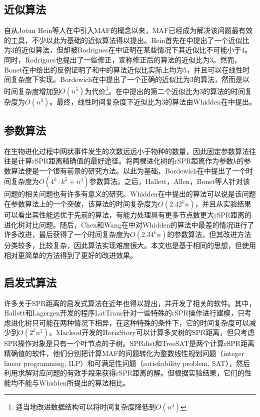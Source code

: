 \subsection{近似算法}
自从Jotun Hein等人在\cite{hein1996complexity}中引入MAF的概念以来，MAF已经成为解决该问题最有效的工具，不少以此为基础的近似算法得以提出。Hein首先在\cite{hein1996complexity}中提出了一个近似比为3的近似算法，但却被Rodrigues在\cite{rodrigues2007maximum}中证明在某些情况下其近似比不可能小于4。同时，Rodrigues也提出了一些修正，宣称修正后的算法的近似比为3。然而，Bonet在\cite{bonet2006approximating}中给出的反例证明了\cite{hein1996complexity}和\cite{rodrigues2007maximum}中的算法近似比实际上均为5，并且可以在线性时间复杂度下实现。Bordewich在\cite{bordewich20083}中提出了一个正确的近似比为3的算法，然而是以时间复杂度增加到$O(n^5)$为代价\footnote{适当地改进数据结构可以将时间复杂度降低到$O(n^4)$}。在\cite{rodrigues2007maximum}中提出的第二个近似比为3的算法的时间复杂度为$O(n^2)$。最终，线性时间复杂度下近似比为3的算法由Whidden在\cite{whidden2009unifying}中提出。                                                                                                                                                                                                                                                             
\subsection{参数算法}
在生物进化过程中网状事件发生的次数远远小于物种的数量，因此固定参数算法往往是计算rSPR距离精确值的最好途径。将两棵进化树的rSPR距离作为参数$k$的参数算法便是一个很有前景的研究方法。以此为基础，Bordewich在\cite{bordewich20083}中提出了一个时间复杂度为$O(4^k \cdot k^5 + n^3)$参数算法。之后，Hallett，Allen，Bonet等人针对该问题的相关问题也有许多有意义的研究。Whidden在\cite{whidden2010fast}中提出的算法可以说是该问题在参数算法上的一个突破，该算法的时间复杂度为$O(2.42^kn)$，并且从实验结果可以看出其性能远优于先前的算法，有能力处理具有更多节点数更大rSPR距离的进化树对比问题。随后，Chen和Wang在\cite{chen2012faster}中对Whidden的算法中最差的情况进行了许多改进，最后获得了一个时间复杂度为$O(2.34^kn)$的参数算法，但其改进方法分类较多，比较复杂，因此算法实现难度很大。本文也是基于相同的思想，但使用相对更简单的方法得到了更好的改进效果。

\subsection{启发式算法}
许多关于SPR距离的启发式算法在近年也得以提出，并开发了相关的软件。其中，Hallett和Lagergen开发的程序LatTrans针对一些特殊的rSPR操作进行建模，只考虑进化树只可能在两种情况下相异，在这种特殊的条件下，它的时间复杂度可以减少到$O(2^kn^2)$。Macleod开发的HorizStory可以计算多叉树的SPR距离，但只考虑SPR操作对象是只有一个叶节点的子树。SPRdist和TreeSAT是两个计算rSPR距离精确值的软件，他们分别把计算MAF的问题转化为整数线性规划问题（integer linear programming, ILP）和可满足性问题（satisfiability problem, SAT），然后利用求解对应问题的有效手段来获得rSPR距离的解。但根据实验结果，它们的性能均不能与Whidden所提出的算法相比。

